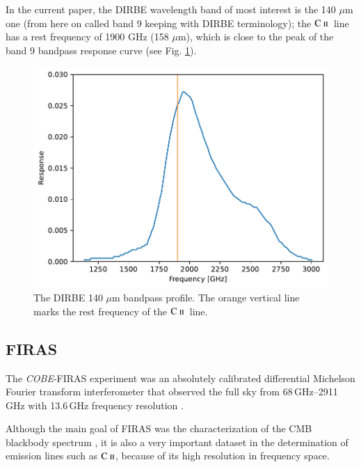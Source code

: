 \documentclass{aa}
\newcommand{\mathsc}[1]{{\normalfont\textsc{#1}}}
\def\COBE{\textit{COBE}}
\newcommand{\cii}{\ensuremath{\mathsc {C\ ii}}}
\begin{document}
In the current paper, the DIRBE wavelength band of most interest is the 140
$\mu$m one (from here on called band 9 keeping with DIRBE terminology); the
\cii\ line has a rest frequency of 1900 GHz (158 $\mu$m), which is close to the
peak of the band 9 bandpass response curve (see Fig. \ref{fig:140_bp}).

\begin{figure}
    \centering
    \includegraphics[width=\columnwidth]{figures/dirbe_09_bandpass_vs_cii.pdf}
    \caption{The DIRBE 140 $\mu$m bandpass profile. The orange vertical line marks the rest frequency of the \cii\ line.}
    \label{fig:140_bp}
\end{figure}

\subsection{FIRAS}
The \COBE-FIRAS experiment was an absolutely calibrated differential Michelson Fourier transform interferometer that observed the full sky from 68\,GHz--2911\,GHz with 13.6\,GHz frequency resolution \citep{fixsen:1994,mather:1999}. 

Although the main goal of FIRAS was the characterization of the CMB blackbody spectrum \citep{mather:1994}, it is also a very important dataset in the determination of emission lines such as \cii, because of its high resolution in frequency space.
\end{document}

